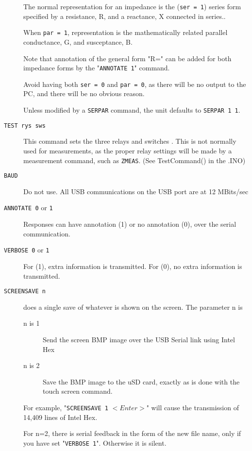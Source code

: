 \begin{description}
The normal representation for an impedance is the (\texttt{ser = 1}) series form specified by a resistance, R, and a reactance, X connected in series..

When \texttt{par = 1}, representation is the mathematically related parallel conductance, G, and susceptance, B.

Note that annotation of the general form "R=" can be added for both impedance forms by the "\texttt{ANNOTATE 1}" command.

Avoid having both \texttt{ser = 0} and \texttt{par = 0}, as there will be no output to the PC, and there will be no obvious reason.

Unless modified by a \texttt{SERPAR} command, the unit defaults to \newline \texttt{SERPAR 1 1}.

\item[\texttt{TEST rys sws}] This command sets the three relays and switches .  This is not normally used for measurements, as the proper relay settings will be made by a measurement command, such as \texttt{ZMEAS}.  (See TestCommand()  in the .INO)

\item[\texttt{BAUD}]   Do not use.  All USB communications on the USB port are at 12 MBits/sec

\item[\texttt{ANNOTATE 0} or \texttt{1}]  Responses can have annotation (1) or no annotation (0), over the serial communication.

\item[\texttt{VERBOSE 0} or \texttt{1}]  For (1), extra information is transmitted. For (0), no extra information is transmitted.

\item[\texttt{SCREENSAVE n}] does a single save of whatever is shown on the screen.  The parameter n is
\begin{description}
\item[n is 1] Send the screen BMP image over the USB Serial link using Intel Hex
\item[n is 2] Save the BMP image to the uSD card, exactly as is done with the touch screen command.
\end{description}

For example, "\texttt{SCREENSAVE 1} $<Enter>$" will cause the transmission of 14,409 lines of Intel Hex.

For n=2, there is serial feedback in the form of the new file name, only if you have set "\texttt{VERBOSE 1}".  Otherwise it is silent.


\end{description}
